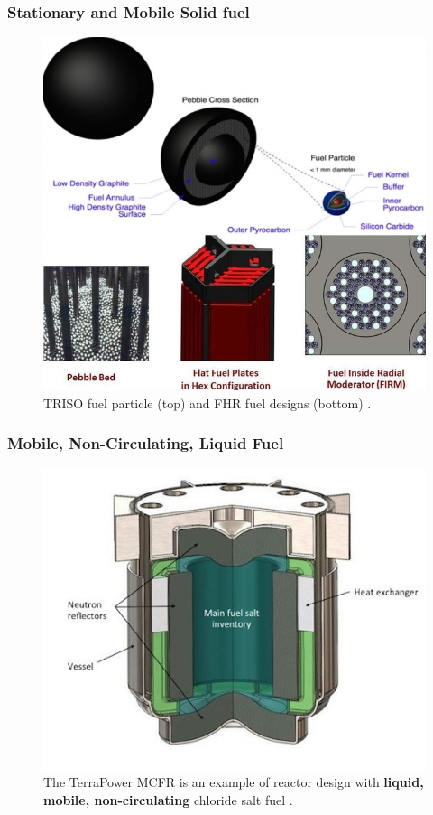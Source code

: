 \begin{frame}
\frametitle{Stationary and Mobile Solid fuel}
\vspace*{-0.1in}
\begin{figure}[t]
	\hspace*{-0.35in}
	\includegraphics[height=0.63\textwidth]{./images/solid_fuel.jpg}
	\caption{TRISO fuel particle (top) and FHR fuel designs (bottom) 
	\cite{forsberg_basis_2016}.} 
\end{figure}   
\end{frame}

\begin{frame}
\frametitle{Mobile, Non-Circulating, Liquid Fuel}
\begin{figure}[t]
\vspace*{-0.1in}
\hspace*{-0.35in}
\includegraphics[height=0.6\textwidth]{./images/mcfr-crossection.jpg}
\caption{The TerraPower MCFR is an example of reactor design with 
\textbf{liquid, mobile, non-circulating} chloride salt fuel 
\cite{doene_southern_2018}.}
\end{figure}   

\end{frame}


